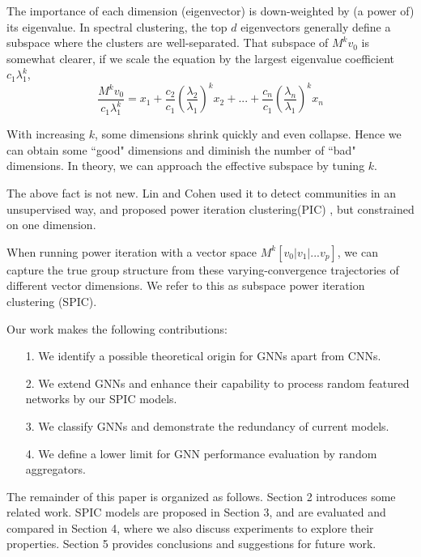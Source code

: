 \documentclass[preprint,11pt]{elsarticle}
\begin{document}
The importance of each dimension (eigenvector) is down-weighted by (a power of) its eigenvalue. In spectral clustering, the top $d$ eigenvectors generally define a subspace where the clusters are well-separated. That subspace of  $M^k  v_0$ is somewhat clearer, if we scale the equation by the largest eigenvalue coefficient $c_1 \lambda^k_1 $,
\begin{equation}
\frac{M^k v_0}{c_1 \lambda^k_1 }=  x_1 +\frac{c_2}{c_1} (\frac{\lambda_2}{\lambda_1})^k x_2+...+\frac{c_n}{c_1} (\frac{\lambda_n}{\lambda_1} )^k x_n 
\end{equation}

With increasing $k$, some dimensions shrink quickly and even collapse. Hence we can obtain some ``good" dimensions and diminish the number of ``bad" dimensions. In theory, we can approach the effective subspace by tuning $k$.

The above fact is not new. Lin and Cohen used it to detect communities in an unsupervised way, and proposed power iteration clustering(PIC)  \cite{ref2}, but constrained on one dimension.

When running power iteration with a vector space $M^k [v_0|v_1|...v_p]$, we can capture the true group structure from these varying-convergence trajectories of different vector dimensions. We refer to this as subspace power iteration clustering (SPIC).

Our work makes the following contributions:
\begin{itemize}
	\item [1.]
	 We identify a possible theoretical origin for GNNs apart from CNNs.
	 \item [2.] 
	 We extend GNNs and enhance their capability to process random featured networks by our SPIC models.
	 \item [3.]
	 We classify GNNs and demonstrate the redundancy of current models.
	 \item [4.]
	 We define a lower limit for GNN performance evaluation by random aggregators.
\end{itemize}

The remainder of this paper is organized as follows. Section 2 introduces some related work. SPIC models are proposed in Section 3, and are evaluated and compared in Section 4, where we also discuss experiments to explore their properties. Section 5 provides conclusions and suggestions for future work.
\end{document}
